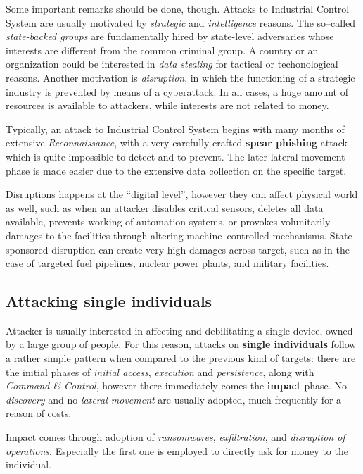 \documentclass[10pt]{\classname}
\begin{document}
Some important remarks should be done, though. Attacks to Industrial Control
System are usually motivated by \emph{strategic} and \emph{intelligence}
reasons. The so--called \emph{state\--backed groups} are fundamentally hired
by state\--level adversaries whose interests are different from the common
criminal group. A country or an organization could be interested in \emph{data
stealing} for tactical or techonological reasons. Another motivation is
\emph{disruption}, in which the functioning of a strategic industry is
prevented by means of a cyberattack. In all cases, a huge amount of resources
is available to attackers, while interests are not related to money.

Typically, an attack to Industrial Control System begins with many months of
extensive \emph{Reconnaissance}, with a very\--carefully crafted \textbf{spear
phishing} attack which is quite impossible to detect and to prevent. The later
lateral movement phase is made easier due to the extensive data collection on
the specific target.

Disruptions happens at the ``digital level'', however they can affect physical
world as well, such as when an attacker disables critical sensors, deletes all
data available, prevents working of automation systems, or provokes
volunitarily damages to the facilities through altering machine--controlled
mechanisms. State--sponsored disruption can create very high damages across
target, such as in the case of targeted fuel pipelines, nuclear power plants,
and military facilities.


\subsection{Attacking single individuals}

Attacker is usually interested in affecting and debilitating a single device,
owned by a large group of people. For this reason, attacks on \textbf{single
individuals} follow a rather simple pattern when compared to the previous kind
of targets: there are the initial phases of \emph{initial access},
\emph{execution} and \emph{persistence}, along with \emph{Command \& Control},
however there immediately comes the \textbf{impact} phase. No \emph{discovery}
and no \emph{lateral movement} are usually adopted, much frequently for a
reason of costs.

Impact comes through adoption of \emph{ransomwares}, \emph{exfiltration}, and
\emph{disruption of operations}. Especially the first one is employed to
directly ask for money to the individual.
\end{document}
